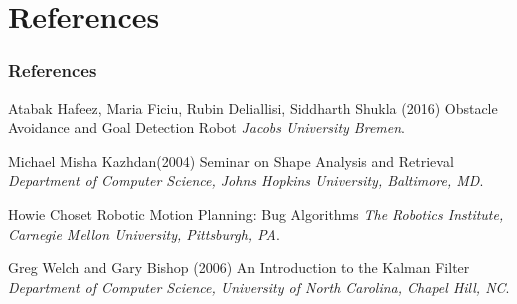 \documentclass{beamer}
\begin{document}
\section{References}
\begin{frame}
\frametitle{References}
\footnotesize{
\begin{thebibliography}{99} %
 Atabak Hafeez, Maria Ficiu, Rubin Deliallisi, Siddharth Shukla (2016)
\newblock Obstacle Avoidance and Goal Detection Robot
\newblock \emph{Jacobs University Bremen}.

 Michael Misha Kazhdan(2004)
\newblock Seminar on Shape Analysis and Retrieval
\newblock \emph{Department of Computer Science,
Johns Hopkins University, Baltimore, MD}.

 Howie Choset
\newblock Robotic Motion Planning: Bug Algorithms
\newblock \emph{The Robotics Institute,
Carnegie Mellon University, Pittsburgh, PA}.


 Greg Welch and Gary Bishop (2006)
\newblock An Introduction to the Kalman Filter
\newblock \emph{Department of Computer Science,
University of North Carolina, Chapel Hill, NC}.
\end{thebibliography}
}
\end{frame}

\end{document}
